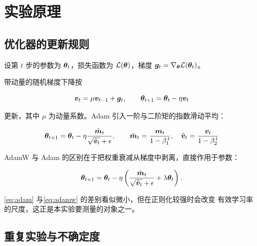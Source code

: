 \section{实验原理}
\label{sec:principle}

\subsection{优化器的更新规则}
\label{sec:principle:update}

设第 $t$ 步的参数为 $\bm{\theta}_t$，损失函数为 $\mathcal{L}(\bm{\theta})$，梯度
$\bm{g}_t = \nabla_{\bm{\theta}} \mathcal{L}(\bm{\theta}_t)$。

带动量的随机梯度下降按

\begin{equation}
  \label{eq:sgdm}
  \bm{v}_t = \mu \bm{v}_{t-1} + \bm{g}_t, \qquad
  \bm{\theta}_{t+1} = \bm{\theta}_t - \eta \bm{v}_t
\end{equation}

更新，其中 $\mu$ 为动量系数。Adam 引入一阶与二阶矩的指数滑动平均：

\begin{equation}
  \label{eq:adam}
  \bm{\theta}_{t+1} = \bm{\theta}_t
    - \eta \frac{\hat{\bm{m}}_t}{\sqrt{\hat{\bm{v}}_t} + \epsilon},
  \qquad
  \hat{\bm{m}}_t = \frac{\bm{m}_t}{1 - \beta_1^{\,t}},\quad
  \hat{\bm{v}}_t = \frac{\bm{v}_t}{1 - \beta_2^{\,t}}
\end{equation}

AdamW 与 Adam 的区别在于把权重衰减从梯度中剥离，直接作用于参数：

\begin{equation}
  \label{eq:adamw}
  \bm{\theta}_{t+1} = \bm{\theta}_t
    - \eta \left( \frac{\hat{\bm{m}}_t}{\sqrt{\hat{\bm{v}}_t} + \epsilon}
                 + \lambda \bm{\theta}_t \right).
\end{equation}

\cref{eq:adam} 与\cref{eq:adamw} 的差别看似微小，但在正则化较强时会改变
有效学习率的尺度，这正是本实验要测量的对象之一\cite{loshchilov2019adamw}。

\subsection{重复实验与不确定度}
\label{sec:principle:uncertainty}

